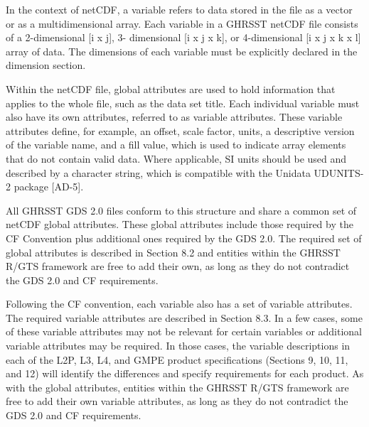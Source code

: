 In the context of netCDF, a variable refers to data stored in the file as a vector or as a
multidimensional array. Each variable in a GHRSST netCDF file consists of a 2-dimensional [i x j], 3-
dimensional [i x j x k], or 4-dimensional [i x j x k x l] array of data. The dimensions of each variable
must be explicitly declared in the dimension section. \par \vspace{0.1in}

Within the netCDF file, global attributes are used to hold information that applies to the whole file, such
as the data set title. Each individual variable must also have its own attributes, referred to as variable
attributes. These variable attributes define, for example, an offset, scale factor, units, a descriptive
version of the variable name, and a fill value, which is used to indicate array elements that do not
contain valid data. Where applicable, SI units should be used and described by a character string,
which is compatible with the Unidata UDUNITS-2 package [AD-5]. \par \vspace{0.1in}

All GHRSST GDS 2.0 files conform to this structure and share a common set of netCDF global
attributes. These global attributes include those required by the CF Convention plus additional ones
required by the GDS 2.0. The required set of global attributes is described in Section 8.2 and entities
within the GHRSST R/GTS framework are free to add their own, as long as they do not contradict the
GDS 2.0 and CF requirements. \par \vspace{0.1in}

Following the CF convention, each variable also has a set of variable attributes. The required variable
attributes are described in Section 8.3. In a few cases, some of these variable attributes may not be
relevant for certain variables or additional variable attributes may be required. In those cases, the
variable descriptions in each of the L2P, L3, L4, and GMPE product specifications (Sections 9, 10, 11,
and 12) will identify the differences and specify requirements for each product. As with the global
attributes, entities within the GHRSST R/GTS framework are free to add their own variable attributes,
as long as they do not contradict the GDS 2.0 and CF requirements. \par \vspace{0.1in}

